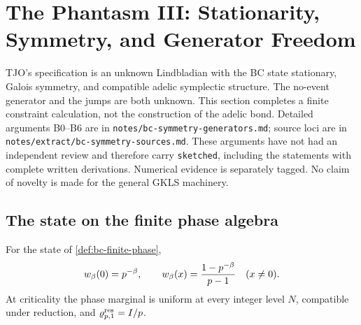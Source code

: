 
\section{The Phantasm III: Stationarity, Symmetry, and Generator Freedom}
\label{sec:bc-symmetry-generators}

TJO's specification is an unknown Lindbladian with the BC state stationary,
Galois symmetry, and compatible adelic symplectic structure. The no-event
generator and the jumps are both unknown. This section completes a finite
constraint calculation, not the construction of the adelic bond. Detailed
arguments B0--B6 are in \texttt{notes/bc-symmetry-generators.md}; source loci
are in \texttt{notes/extract/bc-symmetry-sources.md}. These arguments have not
had an independent review and therefore carry \texttt{sketched}, including
the statements with complete written derivations. Numerical evidence is
separately tagged. No claim of novelty is made for the general GKLS machinery.

\subsection{The state on the finite phase algebra}

\begin{proposition}
\label{prop:bc-residue-state}
For the state of \cref{def:bc-finite-phase},
\[
 w_{\beta}(0)=p^{-\beta},\qquad
 w_{\beta}(x)=\frac{1-p^{-\beta}}{p-1}\quad(x\ne0).
\]
At criticality the phase marginal is uniform at every integer level $N$,
compatible under reduction, and $\varrho^{\mathrm{res}}_{p,1}=I/p$.
\end{proposition}

